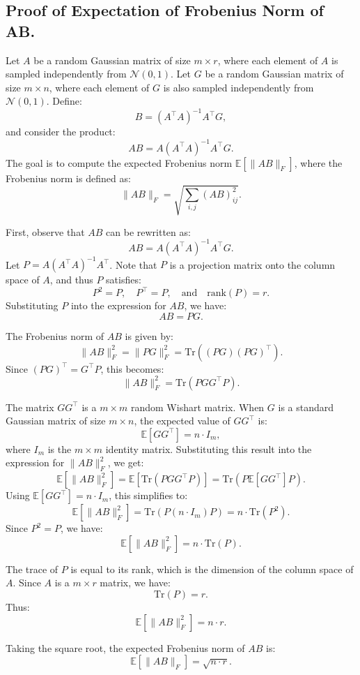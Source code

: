\subsection{Proof of Expectation of Frobenius Norm of AB.}
\label{scale}

Let \( A \) be a random Gaussian matrix of size \( m \times r \), where each element of \( A \) is sampled independently from \( \mathcal{N}(0, 1) \). Let \( G \) be a random Gaussian matrix of size \( m \times n \), where each element of \( G \) is also sampled independently from \( \mathcal{N}(0, 1) \). Define:
\[
B = (A^\top A)^{-1} A^\top G,
\]
and consider the product:
\[
AB = A (A^\top A)^{-1} A^\top G.
\]
The goal is to compute the expected Frobenius norm \( \mathbb{E}[\|AB\|_F] \), where the Frobenius norm is defined as:
\[
\|AB\|_F = \sqrt{\sum_{i,j} (AB)_{ij}^2}.
\]

First, observe that \( AB \) can be rewritten as:
\[
AB = A (A^\top A)^{-1} A^\top G.
\]
Let \( P = A (A^\top A)^{-1} A^\top \). Note that \( P \) is a projection matrix onto the column space of \( A \), and thus \( P \) satisfies:
\[
P^2 = P, \quad P^\top = P, \quad \text{and} \quad \text{rank}(P) = r.
\]
Substituting \( P \) into the expression for \( AB \), we have:
\[
AB = P G.
\]

The Frobenius norm of \( AB \) is given by:
\[
\|AB\|_F^2 = \|PG\|_F^2 = \text{Tr}((PG)(PG)^\top).
\]
Since \( (PG)^\top = G^\top P \), this becomes:
\[
\|AB\|_F^2 = \text{Tr}(P G G^\top P).
\]

The matrix \( G G^\top \) is a \( m \times m \) random Wishart matrix. When \( G \) is a standard Gaussian matrix of size \( m \times n \), the expected value of \( G G^\top \) is:
\[
\mathbb{E}[G G^\top] = n \cdot I_m,
\]
where \( I_m \) is the \( m \times m \) identity matrix. Substituting this result into the expression for \( \|AB\|_F^2 \), we get:
\[
\mathbb{E}[\|AB\|_F^2] = \mathbb{E}[\text{Tr}(P G G^\top P)] = \text{Tr}(P \mathbb{E}[G G^\top] P).
\]
Using \( \mathbb{E}[G G^\top] = n \cdot I_m \), this simplifies to:
\[
\mathbb{E}[\|AB\|_F^2] = \text{Tr}(P (n \cdot I_m) P) = n \cdot \text{Tr}(P^2).
\]
Since \( P^2 = P \), we have:
\[
\mathbb{E}[\|AB\|_F^2] = n \cdot \text{Tr}(P).
\]

The trace of \( P \) is equal to its rank, which is the dimension of the column space of \( A \). Since \( A \) is a \( m \times r \) matrix, we have:
\[
\text{Tr}(P) = r.
\]
Thus:
\[
\mathbb{E}[\|AB\|_F^2] = n \cdot r.
\]

Taking the square root, the expected Frobenius norm of \( AB \) is:
\[
\boxed{\mathbb{E}[\|AB\|_F] = \sqrt{n \cdot r}.}
\]

